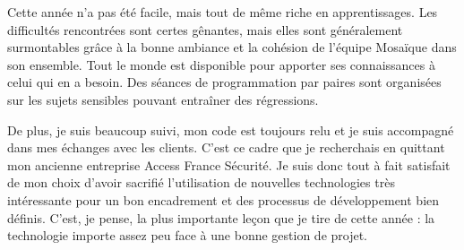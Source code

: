 Cette année n'a pas été facile, mais tout de même riche en apprentissages. Les difficultés rencontrées sont certes gênantes, mais elles sont généralement surmontables grâce à la bonne ambiance et la cohésion de l'équipe Mosaïque dans son ensemble. Tout le monde est disponible pour apporter ses connaissances à celui qui en a besoin. Des séances de programmation par paires sont organisées sur les sujets sensibles pouvant entraîner des régressions.

De plus, je suis beaucoup suivi, mon code est toujours relu et je suis accompagné dans mes échanges avec les clients. C'est ce cadre que je recherchais en quittant mon ancienne entreprise Access France Sécurité. Je suis donc tout à fait satisfait de mon choix d'avoir sacrifié l'utilisation de nouvelles technologies très intéressante pour un bon encadrement et des processus de développement bien définis. C'est, je pense, la plus importante leçon que je tire de cette année : la technologie importe assez peu face à une bonne gestion de projet.
